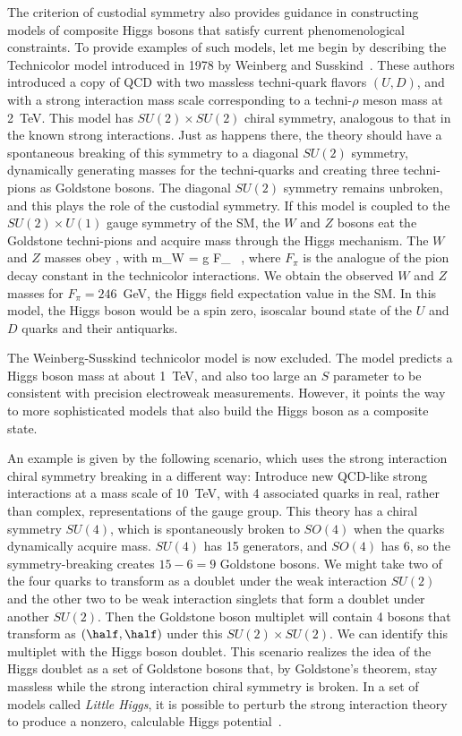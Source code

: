 \documentclass[12pt]{article}
\begin{document}
The criterion of custodial symmetry also provides guidance in
constructing models of composite Higgs bosons that satisfy current
phenomenological constraints.  To provide examples of such models, let
me begin by describing the Technicolor model introduced in 1978 by
Weinberg
and Susskind~\cite{WeinbergT,Susskind}. These authors introduced a copy
of QCD with two massless techni-quark flavors $(U,D)$, and with a
strong
interaction mass scale corresponding to a techni-$\rho$ meson mass at
2~TeV.    This model has $SU(2)\times SU(2)$ chiral symmetry,
analogous to that in the known strong interactions.   Just as happens
there, the theory should have a spontaneous breaking of this symmetry
to a diagonal $SU(2)$ symmetry, dynamically generating masses for the
techni-quarks and creating three techni-pions as Goldstone bosons. The
diagonal $SU(2)$ symmetry remains unbroken, and this plays the role of
the custodial symmetry.   If
this model is coupled to the $SU(2)\times U(1)$ gauge symmetry of the
SM, the $W$ and $Z$ bosons eat the Goldstone techni-pions
and acquire mass through the Higgs mechanism.    The $W$ and $Z$
masses obey  , with 
\beq
       m_W = {g F_\pi{}} \ , 
\eeqn
where $F_\pi$ is the analogue of the pion decay constant in the
technicolor interactions.   We obtain the observed $W$ and $Z$ masses 
for $F_\pi = 246$~GeV, the Higgs field expectation value in the
SM.   In this model, the Higgs boson would be a  spin zero, isoscalar
bound state of the $U$ and $D$ quarks and their antiquarks.

The Weinberg-Susskind technicolor model is now excluded.   The model
predicts a Higgs boson mass at about 1~TeV, and also too large an $S$
parameter to be consistent with precision electroweak measurements.
However, it points the way to more sophisticated models that also
build the Higgs boson as a composite state.

An example is given by the following scenario, which uses the strong
interaction chiral symmetry breaking in a different way:  Introduce
new QCD-like strong interactions at a mass scale of 10~TeV, with
4 associated quarks in real, rather than complex, representations of
the gauge group.   This theory has a chiral symmetry
$SU(4)$, which is spontaneously broken to $SO(4)$ when the quarks
dynamically acquire mass. $SU(4)$ has 15 generators, and
$SO(4)$ has 6, so the symmetry-breaking creates $15-6 = 9$
Goldstone bosons. We might  take two of the four quarks to transform as a
doublet under the weak interaction $SU(2)$ and the other two to be
weak interaction singlets  that form a doublet under another $SU(2)$.
Then the Goldstone boson multiplet will contain 4 bosons that
transform as  $(\half, \half)$ under this $SU(2)\times SU(2)$.   We
can identify this multiplet with the Higgs boson doublet.  This
scenario
realizes the idea of the Higgs doublet as a set of Goldstone bosons
that, by Goldstone's theorem, stay massless while the strong
interaction chiral symmetry is broken.   In a set of models called
{\it Little Higgs}, it is possible to perturb the strong interaction
theory to produce a nonzero, calculable Higgs 
potential~\cite{LittleH,LittleHreview}.
\end{document}

